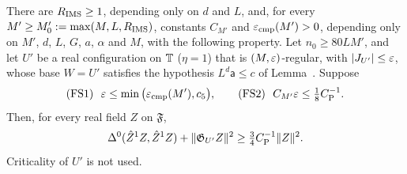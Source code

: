 \begin{detail}\label{xb:d-k0-lower}
There are $R_{\rm IMS}\ge1$, depending only on $d$ and $L$, and, for every $M'\ge M'_0:=\max(M,L,R_{\rm IMS})$, constants $C_{M'}$ and $\varepsilon_{\rm cmp}(M')>0$, depending only on $M'$, $d$, $L$, $G$, $a$, $\alpha$ and $M$, with the following property. Let $n_0\ge80LM'$, and let $U'$ be a real configuration on $\mathbb T$ ($\eta=1$) that is $(M,\varepsilon)$-regular, with $|J_{U'}|\le\varepsilon$, whose base $W=U'$ satisfies the hypothesis $L^d\mathsf a\le c$ of Lemma~. Suppose
\begin{equation}\label{xb:eq-T12}
\text{(FS1)}\ \ \varepsilon\le\min\big(\varepsilon_{\rm cmp}(M'),c_5\big),\qquad\text{(FS2)}\ \ C_{M'}\varepsilon\le\tfrac18C_{\rm P}^{-1}.
\end{equation}
Then, for every real field $Z$ on $\mathfrak F$,
\[
\Delta^0(\hat Z^1Z,\hat Z^1Z)+\|\mathfrak G_{U'}Z\|^2\ge\tfrac34C_{\rm P}^{-1}\|Z\|^2 .
\]
Criticality of $U'$ is not used.
\end{detail}

